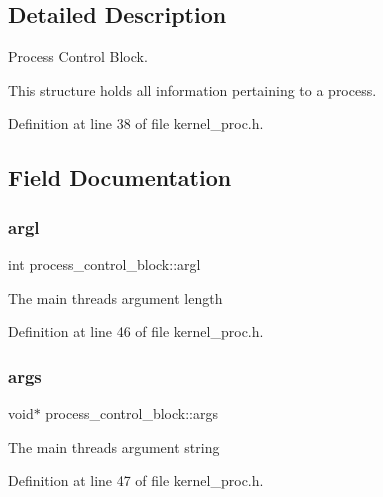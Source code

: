 \subsection{Detailed Description}
Process Control Block. 

This structure holds all information pertaining to a process. 

Definition at line 38 of file kernel\+\_\+proc.\+h.



\subsection{Field Documentation}
\mbox{\label{structprocess__control__block_a8c8667a0f61f4380b3d5c69c57315511}} 
\subsubsection{\texorpdfstring{argl}{argl}}
{\footnotesize\ttfamily int process\+\_\+control\+\_\+block\+::argl}

The main thread\textquotesingle{}s argument length 

Definition at line 46 of file kernel\+\_\+proc.\+h.

\mbox{\label{structprocess__control__block_af7ac33b69a8a1dc582e0fa35cc90568a}} 
\subsubsection{\texorpdfstring{args}{args}}
{\footnotesize\ttfamily void$\ast$ process\+\_\+control\+\_\+block\+::args}

The main thread\textquotesingle{}s argument string 

Definition at line 47 of file kernel\+\_\+proc.\+h.

\mbox{\label{structprocess__control__block_a6bcb52e96fdf96d060af2b11f07d44bd}} 
